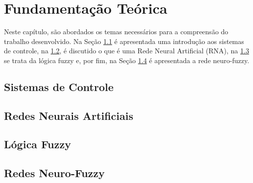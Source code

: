 %
%

\chapter{Fundamentação Teórica}
\label{chap:fundamentacaoTeorica}

Neste capítulo, são abordados os temas necessários para a compreensão do trabalho desenvolvido. Na Seção \ref{sec:fundamentacaoTeorica-sistemas-controle} é apresentada uma introdução aos sistemas de controle, na \ref{sec:fundamentacaoTeorica-rna}, é discutido o que é uma Rede Neural Artificial (RNA), na \ref{sec:fundamentacaoTeorica-fuzzy} se trata da lógica fuzzy e, por fim, na Seção \ref{sec:fundamentacaoTeorica-neuro-fuzzy} é apresentada a rede neuro-fuzzy.

\section{Sistemas de Controle}
\label{sec:fundamentacaoTeorica-sistemas-controle}



\section{Redes Neurais Artificiais}
\label{sec:fundamentacaoTeorica-rna}



\section{Lógica Fuzzy}
\label{sec:fundamentacaoTeorica-fuzzy}



\section{Redes Neuro-Fuzzy}
\label{sec:fundamentacaoTeorica-neuro-fuzzy}
%



